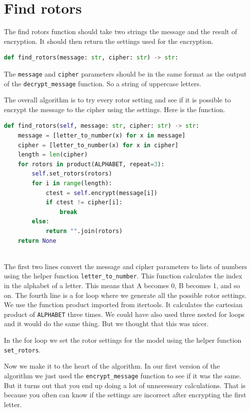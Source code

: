 \documentclass{article}
\begin{document}
\section{Find rotors}
The find rotors function should take two strings the message and the result of encryption. It should then return the settings used for the encryption.
\begin{lstlisting}[language=Python]
def find_rotors(message: str, cipher: str) -> str:
\end{lstlisting}
The \verb|message| and \verb|cipher| parameters should be in the same format as the output of the \verb|decrypt_message| function. So a string of uppercase letters.

The overall algorithm is to try every rotor setting and see if it is possible to encrypt the message to the cipher using the settings.
Here is the function.

\begin{lstlisting}[language=Python]
def find_rotors(self, message: str, cipher: str) -> str:
    message = [letter_to_number(x) for x in message]
    cipher = [letter_to_number(x) for x in cipher]
    length = len(cipher)
    for rotors in product(ALPHABET, repeat=3):
        self.set_rotors(rotors)
        for i in range(length):
            ctest = self.encrypt(message[i])
            if ctest != cipher[i]:
                break
        else:
            return "".join(rotors)
    return None
    
\end{lstlisting}

The first two lines convert the message and cipher parameters to lists of numbers using the helper function \verb|letter_to_number|. This function calculates the index in the alphabet of a letter. This means that A becomes 0, B becomes 1, and so on. 
The fourth line is a for loop where we generate all the possible rotor settings. We use the function product imported from itertools. It calculates the cartesian product of \verb|ALPHABET| three times. We could have also used three nested for loops and it would do the same thing. But we thought that this was nicer. 

In the for loop we set the rotor settings for the model using the helper function \verb|set_rotors|. 

Now we make it to the heart of the algorithm. In our first version of the algorithm we just used the \verb|encrypt_message| function to see if it was the same. But it turns out that you end up doing a lot of unnecessary calculations. That is because you often can know if the settings are incorrect after encrypting the first letter.
\end{document}
